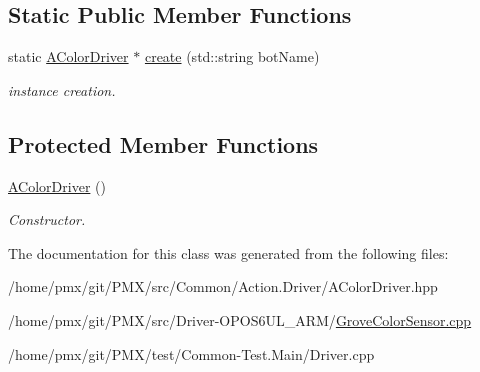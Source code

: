 \subsection*{Static Public Member Functions}
\begin{DoxyCompactItemize}
\item 
\mbox{\label{classAColorDriver_ad569d1e4c0e481fdba30a6e5c9691743}} 
static \hyperlink{classAColorDriver}{A\+Color\+Driver} $\ast$ \hyperlink{classAColorDriver_ad569d1e4c0e481fdba30a6e5c9691743}{create} (std\+::string bot\+Name)
\begin{DoxyCompactList}\small\item\em instance creation. \end{DoxyCompactList}\end{DoxyCompactItemize}
\subsection*{Protected Member Functions}
\begin{DoxyCompactItemize}
\item 
\mbox{\label{classAColorDriver_a90d8bb79fd76c030f31e29a32c32834a}} 
\hyperlink{classAColorDriver_a90d8bb79fd76c030f31e29a32c32834a}{A\+Color\+Driver} ()
\begin{DoxyCompactList}\small\item\em Constructor. \end{DoxyCompactList}\end{DoxyCompactItemize}


The documentation for this class was generated from the following files\+:\begin{DoxyCompactItemize}
\item 
/home/pmx/git/\+P\+M\+X/src/\+Common/\+Action.\+Driver/A\+Color\+Driver.\+hpp\item 
/home/pmx/git/\+P\+M\+X/src/\+Driver-\/\+O\+P\+O\+S6\+U\+L\+\_\+\+A\+R\+M/\hyperlink{GroveColorSensor_8cpp}{Grove\+Color\+Sensor.\+cpp}\item 
/home/pmx/git/\+P\+M\+X/test/\+Common-\/\+Test.\+Main/Driver.\+cpp\end{DoxyCompactItemize}
